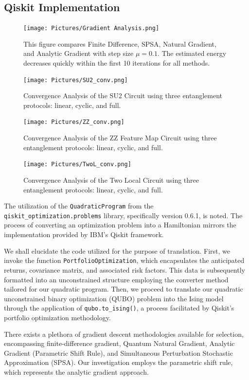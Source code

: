 \documentclass[%
 reprint,
 amsmath,amssymb,
 aps,
]{revtex4-2}
\begin{document}
\subsection{Qiskit Implementation}

\begin{figure}[b]
\texttt{[image: Pictures/Gradient Analysis.png]}
\caption{\label{fig:data} This figure compares Finite Difference, SPSA, Natural Gradient, and Analytic Gradient with step size \( \mu = 0.1 \). The estimated energy decreases quickly within the first 10 iterations for all methods.
}
\texttt{[image: Pictures/SU2\_conv.png]}
\caption{\label{fig:data} Convergence Analysis of the SU2 Circuit using three entanglement protocols: linear, cyclic, and full.
}
\end{figure}

\begin{figure}[b]

\texttt{[image: Pictures/ZZ\_conv.png]}
\caption{\label{fig:data} Convergence Analysis of the ZZ Feature Map Circuit using three entanglement protocols: linear, cyclic, and full.
}
\texttt{[image: Pictures/TwoL\_conv.png]}
\caption{\label{fig:data} Convergence Analysis of the Two Local Circuit using three entanglement protocols: linear, cyclic, and full.
}
\end{figure}


The utilization of the \texttt{QuadraticProgram} from the \texttt{qiskit\_optimization.problems} library, specifically version 0.6.1, is noted. The process of converting an optimization problem into a Hamiltonian mirrors the implementation provided by IBM's Qiskit framework.

We shall elucidate the code utilized for the purpose of translation. First, we invoke the function \texttt{PortfolioOptimization}, which encapsulates the anticipated returns, covariance matrix, and associated risk factors. This data is subsequently formatted into an unconstrained structure employing the converter method tailored for our quadratic program. Then, we proceed to translate our quadratic unconstrained binary optimization (QUBO) problem into the Ising model through the application of \texttt{qubo.to\_ising()}, a process facilitated by Qiskit's portfolio optimization methodology.

There exists a plethora of gradient descent methodologies available for selection, encompassing finite-difference gradient, Quantum Natural Gradient, Analytic Gradient (Parametric Shift Rule), and Simultaneous Perturbation Stochastic Approximation (SPSA). Our investigation employs the parametric shift rule, which represents the analytic gradient approach.
\end{document}
